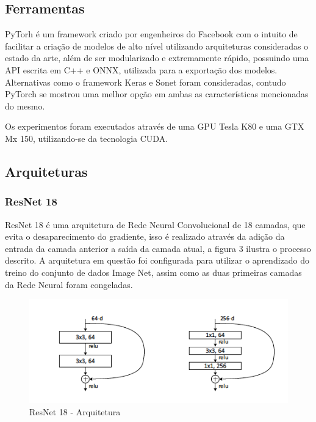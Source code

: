 \documentclass[12pt]{article}
\newcommand\tab[1][1cm]{\hspace*{#1}}
\begin{document}
\subsection{Ferramentas}

\tab\tab[0.5pt] PyTorh é um framework criado por engenheiros do Facebook com o intuito de facilitar a criação de modelos de alto nível utilizando arquiteturas consideradas o estado da arte, além de ser modularizado e extremamente rápido, possuindo uma API escrita em C++ e ONNX, utilizada para a exportação dos modelos. Alternativas como o framework Keras e Sonet foram consideradas, contudo PyTorch se mostrou uma melhor opção em ambas as características mencionadas do mesmo.

Os experimentos foram executados através de uma GPU Tesla K80 e uma GTX Mx 150, utilizando-se da tecnologia CUDA.

\subsection{Arquiteturas}

\subsubsection{ResNet 18}

\tab\tab[0.5pt] ResNet 18 \cite{Resnet18} é uma arquitetura de Rede Neural Convolucional de 18 camadas, que evita o desaparecimento do gradiente, isso é realizado através da adição da entrada da camada anterior a saída da camada atual, a figura 3 ilustra o processo descrito. A arquitetura em questão foi configurada para utilizar o aprendizado do treino do conjunto de dados Image Net, assim como as duas primeiras camadas da Rede Neural foram congeladas.

\begin{figure}[ht]
\centering
\includegraphics[width=.9\textwidth]{resnet18.png}
\caption{ResNet 18 - Arquitetura}
\label{fig:resnet18}
\end{figure}
\end{document}
